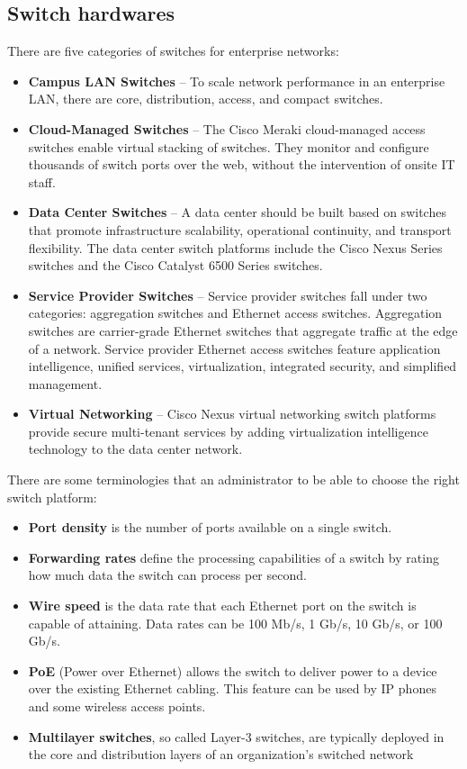 \subsection{Switch hardwares}
There are five categories of switches for enterprise networks:
\begin{itemize}
\item \textbf{Campus LAN Switches} -- To scale network performance in an enterprise LAN, there are core, distribution, access, and compact switches.
\item \textbf{Cloud-Managed Switches} -- The Cisco Meraki cloud-managed access switches enable virtual stacking of switches. They monitor and configure thousands of switch ports over the web, without the intervention of onsite IT staff.
\item \textbf{Data Center Switches} -- A data center should be built based on switches that promote infrastructure scalability, operational continuity, and transport flexibility. The data center switch platforms include the Cisco Nexus Series switches and the Cisco Catalyst 6500 Series switches.
\item \textbf{Service Provider Switches} -- Service provider switches fall under two categories: aggregation switches and Ethernet access switches. Aggregation switches are carrier-grade Ethernet switches that aggregate traffic at the edge of a network. Service provider Ethernet access switches feature application intelligence, unified services, virtualization, integrated security, and simplified management.
\item \textbf{Virtual Networking} -- Cisco Nexus virtual networking switch platforms provide secure multi-tenant services by adding virtualization intelligence technology to the data center network.
\end{itemize}
There are some terminologies that an administrator to be able to choose the right switch platform:
\begin{itemize}
\item \textbf{Port density} is the number of ports available on a single switch.
\item \textbf{Forwarding rates} define the processing capabilities of a switch by rating how much data the switch can process per second.
\item \textbf{Wire speed}  is the data rate that each Ethernet port on the switch is capable of attaining. Data rates can be 100 Mb/s, 1 Gb/s, 10 Gb/s, or 100 Gb/s.
\item \textbf{PoE} (Power over Ethernet) allows the switch to deliver power to a device over the existing Ethernet cabling.  This feature can be used by IP phones and some wireless access points.
\item \textbf{Multilayer switches}, so called Layer-3 switches,  are typically deployed in the core and distribution layers of an organization's switched network
\end{itemize}
